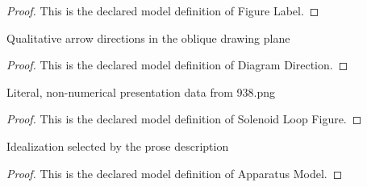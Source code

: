 \begin{proof}
  This is the declared model definition of Figure Label.
\end{proof}
\begin{definition}
  \label{def:physics:phyx-mini-0938:phyxminiproblems-problemphyxmini0938-diagramdirection}
  Qualitative arrow directions in the oblique drawing plane
\end{definition}
\begin{proof}
  This is the declared model definition of Diagram Direction.
\end{proof}
\begin{definition}
  \label{def:physics:phyx-mini-0938:phyxminiproblems-problemphyxmini0938-solenoidloopfigure}
  Literal, non-numerical presentation data from 938.png
\end{definition}
\begin{proof}
  This is the declared model definition of Solenoid Loop Figure.
\end{proof}
\begin{definition}
  \label{def:physics:phyx-mini-0938:phyxminiproblems-problemphyxmini0938-apparatusmodel}
  Idealization selected by the prose description
\end{definition}
\begin{proof}
  This is the declared model definition of Apparatus Model.
\end{proof}
